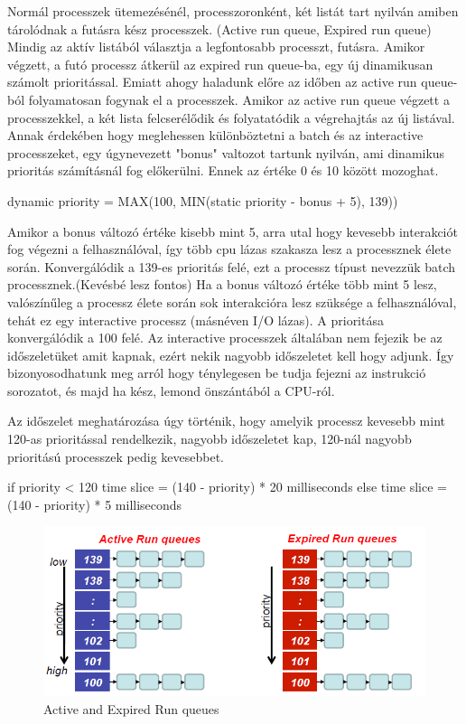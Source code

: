 Normál processzek ütemezésénél, processzoronként, két listát tart nyilván amiben tárolódnak a futásra kész processzek. (Active run queue, Expired run queue)
Mindig az aktív listából választja a legfontosabb processzt, futásra. Amikor végzett, a futó processz átkerül az expired run queue-ba, egy új dinamikusan számolt prioritással.
Emiatt ahogy haladunk előre az időben az active run queue-ból folyamatosan fogynak el a processzek.  Amikor az active run queue végzett a processzekkel, a két lista felcserélődik és folyatatódik a végrehajtás az új listával.
Annak érdekében hogy meglehessen különböztetni a batch és az interactive processzeket, egy úgynevezett "bonus" valtozot tartunk nyilván, ami dinamikus prioritás számításnál fog előkerülni. Ennek az értéke 0 és 10 között mozoghat.
\begin{cpp}
dynamic priority = MAX(100, MIN(static priority - bonus + 5), 139)) 
\end{cpp}
Amikor a bonus változó értéke kisebb mint 5, arra utal hogy kevesebb interakciót fog végezni a felhasználóval, így több cpu lázas szakasza lesz a processznek élete során. Konvergálódik a 139-es prioritás felé, ezt a processz típust nevezzük batch processznek.(Kevésbé lesz fontos) 
Ha a bonus változó értéke több mint 5 lesz, valószínűleg a processz élete során sok interakcióra lesz szüksége a felhasználóval, tehát ez egy interactive processz (másnéven I/O lázas). A prioritása konvergálódik a 100 felé. Az interactive processzek általában nem fejezik be az időszeletüket amit kapnak, ezért nekik nagyobb időszeletet kell hogy adjunk. Így bizonyosodhatunk meg arról hogy ténylegesen be tudja fejezni az instrukció sorozatot, és majd ha kész, lemond önszántából a CPU-ról.

Az időszelet meghatározása úgy történik, hogy amelyik processz kevesebb mint 120-as prioritással rendelkezik, nagyobb időszeletet kap, 120-nál nagyobb prioritású processzek pedig kevesebbet.
\begin{cpp}
if priority < 120 
	time slice = (140 - priority) * 20    milliseconds 
else
	time slice = (140 - priority) * 5   milliseconds 
\end{cpp}

\begin{figure}[h]
\centering
\includegraphics[width=\textwidth]{images/activeexpiredrunqueue.png}
\caption{Active and Expired Run queues}

\label{fig:Active and expired runqueues}
\end{figure}

